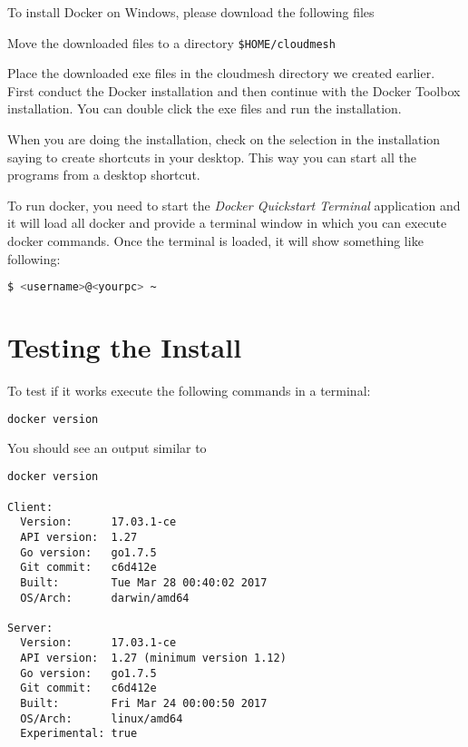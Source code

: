 To install Docker on Windows, please download the following files



Move the downloaded files to a directory \verb|$HOME/cloudmesh|

Place the downloaded exe files in the cloudmesh directory we created
earlier. First conduct the Docker installation and then continue with
the Docker Toolbox installation. You can double click the exe files  and
run the installation.

When you are doing the installation, check on the selection in the
installation saying to create shortcuts in your desktop. This way you
can start all the programs from a desktop shortcut.

To run docker, you need to start the \textit{Docker Quickstart
  Terminal} application and it will load all docker and provide a
terminal window in which you can execute docker commands. Once the
terminal is loaded, it will show something like following:

\begin{lstlisting}[language=bash]
$ <username>@<yourpc> ~
\end{lstlisting}



\section{Testing the Install}

To test if it works execute the following commands in a terminal:

\begin{lstlisting}[language=bash]
docker version
\end{lstlisting}

You should see an output similar to

\begin{lstlisting}
docker version

Client:
  Version:      17.03.1-ce
  API version:  1.27
  Go version:   go1.7.5
  Git commit:   c6d412e
  Built:        Tue Mar 28 00:40:02 2017
  OS/Arch:      darwin/amd64

Server:
  Version:      17.03.1-ce
  API version:  1.27 (minimum version 1.12)
  Go version:   go1.7.5
  Git commit:   c6d412e
  Built:        Fri Mar 24 00:00:50 2017
  OS/Arch:      linux/amd64
  Experimental: true
\end{lstlisting}

